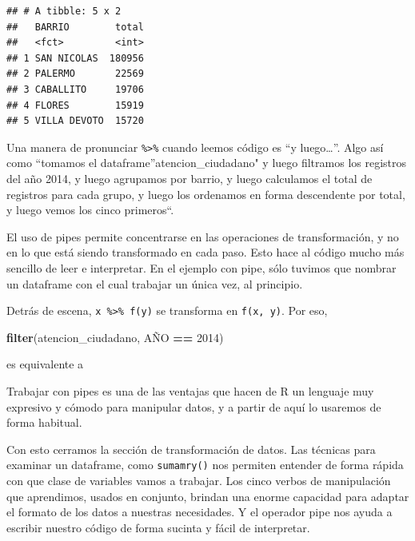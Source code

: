 \documentclass[]{book}
\newenvironment{Shaded}{\begin{snugshade}}{\end{snugshade}}
\newcommand{\KeywordTok}[1]{\textcolor[rgb]{0.13,0.29,0.53}{\textbf{#1}}}
\newcommand{\DecValTok}[1]{\textcolor[rgb]{0.00,0.00,0.81}{#1}}
\newcommand{\StringTok}[1]{\textcolor[rgb]{0.31,0.60,0.02}{#1}}
\newcommand{\OperatorTok}[1]{\textcolor[rgb]{0.81,0.36,0.00}{\textbf{#1}}}
\newcommand{\NormalTok}[1]{#1}
\begin{document}
\begin{verbatim}
## # A tibble: 5 x 2
##   BARRIO        total
##   <fct>         <int>
## 1 SAN NICOLAS  180956
## 2 PALERMO       22569
## 3 CABALLITO     19706
## 4 FLORES        15919
## 5 VILLA DEVOTO  15720
\end{verbatim}

Una manera de pronunciar \texttt{\%\textgreater{}\%} cuando leemos
código es ``y luego\ldots{}''. Algo así como ``tomamos el
dataframe''atencion\_ciudadano" y luego filtramos los registros del año
2014, y luego agrupamos por barrio, y luego calculamos el total de
registros para cada grupo, y luego los ordenamos en forma descendente
por total, y luego vemos los cinco primeros``.

El uso de pipes permite concentrarse en las operaciones de
transformación, y no en lo que está siendo transformado en cada paso.
Esto hace al código mucho más sencillo de leer e interpretar. En el
ejemplo con pipe, sólo tuvimos que nombrar un dataframe con el cual
trabajar un única vez, al principio.

Detrás de escena, \texttt{x\ \%\textgreater{}\%\ f(y)} se transforma en
\texttt{f(x,\ y)}. Por eso,

\begin{Shaded}
\begin{Highlighting}[]
\KeywordTok{filter}\NormalTok{(atencion_ciudadano, AÑO }\OperatorTok{==}\StringTok{ }\DecValTok{2014}\NormalTok{)}
\end{Highlighting}
\end{Shaded}

es equivalente a

\begin{Shaded}
\end{Shaded}

Trabajar con pipes es una de las ventajas que hacen de R un lenguaje muy
expresivo y cómodo para manipular datos, y a partir de aquí lo usaremos
de forma habitual.

Con esto cerramos la sección de transformación de datos. Las técnicas
para examinar un dataframe, como \texttt{sumamry()} nos permiten
entender de forma rápida con que clase de variables vamos a trabajar.
Los cinco verbos de manipulación que aprendimos, usados en conjunto,
brindan una enorme capacidad para adaptar el formato de los datos a
nuestras necesidades. Y el operador pipe nos ayuda a escribir nuestro
código de forma sucinta y fácil de interpretar.
\end{document}
